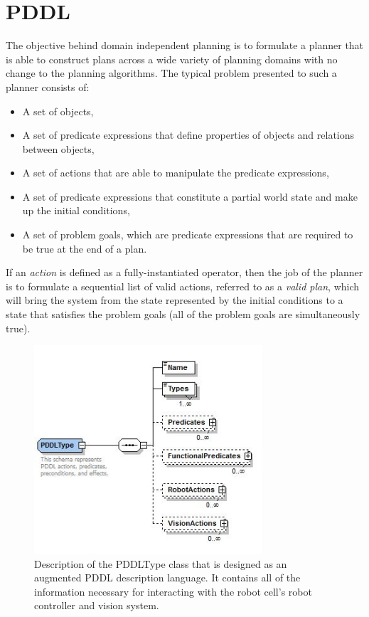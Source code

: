 %
\section{PDDL}
\label{sect:PDDL}
The objective behind domain independent planning is to formulate a
planner that is able to construct plans across a wide variety of planning domains with 
no change to the planning algorithms. The typical problem presented to such a planner
consists of:
%
\begin{itemize}
\item A set of objects,
\item A set of predicate expressions that define properties of
objects and relations between objects,
\item A set of actions that are able to manipulate the predicate
expressions,
\item A set of predicate expressions that constitute a partial
world state and make up the initial conditions,
\item A set of problem goals, which are predicate expressions that are required to be 
true at the end of a plan.
\end{itemize}
%
If an {\it action} is defined as a fully-instantiated operator, then the job of the planner is to formulate a sequential list of valid actions, referred to as a {\it valid plan}, which will bring the system from the state represented by the initial conditions to a state that satisfies the problem goals (all of the problem goals are simultaneously true).
%
\begin{figure}[htb!]
\begin{center}
\includegraphics[width=8.5cm]{images/PDDLType.jpg}
\caption{Description of the PDDLType class that is designed as
an augmented PDDL description language. It contains all of the
information necessary for interacting with the robot cell's
robot controller and vision system.}
\label{fig:pddlType}
\end{center}
\end{figure}
%


